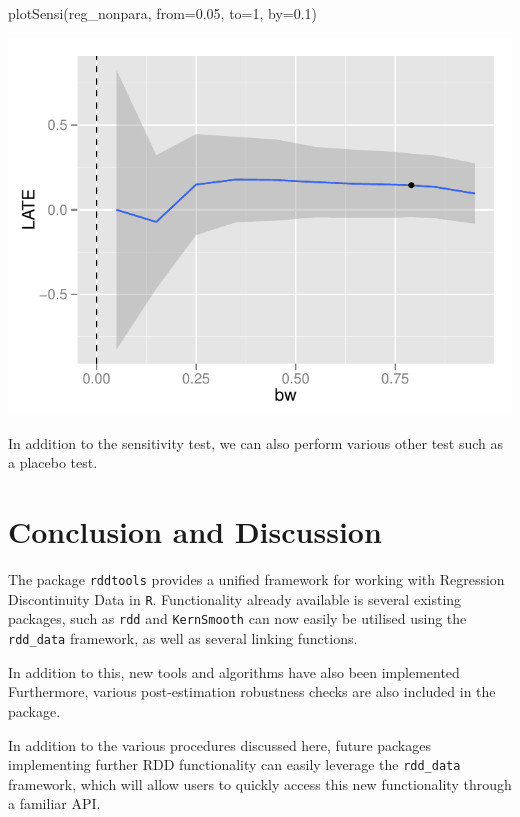 \documentclass[article]{jss}
\begin{document}
\begin{CodeChunk}
\begin{CodeInput}
plotSensi(reg_nonpara, from=0.05, to=1, by=0.1)
\end{CodeInput}


\begin{center}\includegraphics{README_files/figure-latex/sensi-1} \end{center}

\end{CodeChunk}

In addition to the sensitivity test, we can also perform various other
test such as a placebo test.

\section{Conclusion and Discussion}\label{conclusion-and-discussion}

The package \texttt{rddtools} provides a unified framework for working
with Regression Discontinuity Data in \texttt{R}. Functionality already
available is several existing packages, such as \texttt{rdd} and
\texttt{KernSmooth} can now easily be utilised using the
\texttt{rdd\_data} framework, as well as several linking functions.

In addition to this, new tools and algorithms have also been implemented
Furthermore, various post-estimation robustness checks are also included
in the package.

In addition to the various procedures discussed here, future packages
implementing further RDD functionality can easily leverage the
\texttt{rdd\_data} framework, which will allow users to quickly access
this new functionality through a familiar API.
\end{document}
